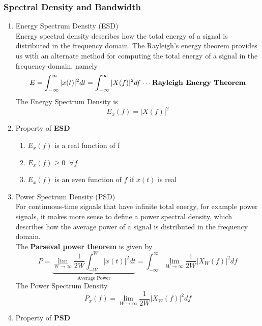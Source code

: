 \subsubsection{Spectral Density and Bandwidth}
\begin{enumerate}
    \item  Energy Spectrum Density (ESD) \\
    Energy spectral density describes how the total energy of a signal is distributed in the frequency domain. The Rayleigh’s energy theorem provides us with an alternate method for computing the total energy of a signal in the frequency-domain, namely
    \begin{equation}
        E = \int^{\infty}_{-\infty}|x(t)|^2dt = \int^{\infty}_{-\infty}|X(f)|^2df \; \text{$\cdots$\textbf{Rayleigh Energy Theorem}}
    \end{equation}
    The Energy Spectrum Density is 
    \begin{equation}
        E_x(f) = |X(f)|^2
    \end{equation}
    \item Property of \textbf{ESD} 
        \begin{enumerate}
            \item $E_x(f)$ is a real function of f
            \item $E_x(f) \geq 0 \;\; \forall f$
            \item $E_x(f)$ is an even function of $f$ if $x(t)$ is real
        \end{enumerate}
    \item Power Spectrum Density (PSD) \\
    For continuous-time signals that have infinite total energy, for example power signals, it makes more sense to define a power spectral density, which describes how the average power of a signal is distributed in the frequency domain.\\
    The \textbf{Parseval power theorem} is given by
    \begin{equation}
        P = \underbrace{\lim_{W\rightarrow\infty}\frac{1}{2W}\int^W_{-W}|x(t)|^2dt}_\text{Average Power} = \int^{\infty}_{-\infty}\lim_{W\rightarrow\infty}\frac{1}{2W}|X_W(f)|^2df
    \end{equation}
    The Power Spectrum Density
    \begin{equation}
        P_x(f) = \lim_{W\rightarrow\infty}\frac{1}{2W}|X_W(f)|^2df
    \end{equation}
    \item Property of \textbf{PSD}

\end{enumerate}
